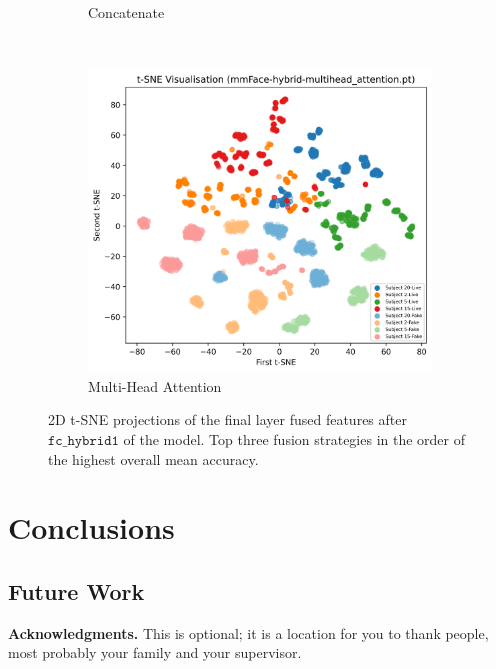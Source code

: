 \documentclass{mpaper}
\begin{document}
\begin{figure}[!htb]
\begin{subfigure}[b]{0.3\textwidth}
        \caption{Concatenate}
        \label{fig:tsne_concatenate}
    \end{subfigure}
    ~
    \begin{subfigure}[b]{0.3\textwidth}
        \includegraphics[width=\textwidth]{figures/tsne_multihead_attention.png}
        \caption{Multi-Head Attention}
        \label{fig:tsne_multihead_attention}
    \end{subfigure}
    \vspace{0.3cm}
    \caption{2D t-SNE projections of the final layer fused features after $\mathtt{fc\_hybrid1}$ of the model. Top three fusion strategies in the order of the highest overall mean accuracy.}
\end{figure}




\section{Conclusions}



\subsection{Future Work}


{\bf Acknowledgments.}
This is optional; it is a location for you to thank people, most probably your family and your supervisor.




\end{document}
